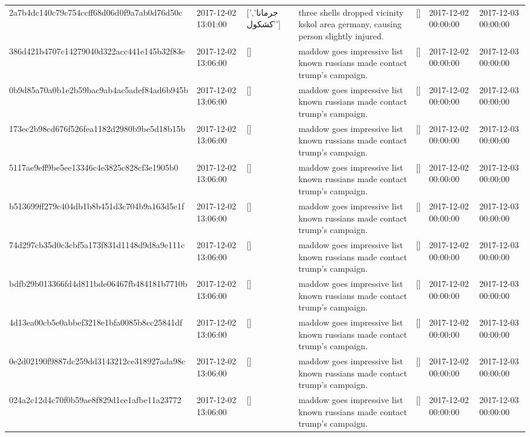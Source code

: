 \begin{tabular}{lllllll}
2a7b4dc140c79c754ccff68d06d0f9a7ab0d76d50c & 2017-12-02 13:01:00 & ['جرمانا', 'كشكول'] & three shells dropped vicinity kskol area germany, causing person slightly injured. & [] & 2017-12-02 00:00:00 & 2017-12-03 00:00:00 \\
386d421b4707c14279040d322acc441e145b32f83e & 2017-12-02 13:06:00 & [] & maddow goes impressive list known russians made contact trump's campaign. & [] & 2017-12-02 00:00:00 & 2017-12-03 00:00:00 \\
0b9d85a70a0b1e2b59bac9ab4ac5adef84ad6b945b & 2017-12-02 13:06:00 & [] & maddow goes impressive list known russians made contact trump's campaign. & [] & 2017-12-02 00:00:00 & 2017-12-03 00:00:00 \\
173ec2b98cd676f526fea1182d2980b9be5d18b15b & 2017-12-02 13:06:00 & [] & maddow goes impressive list known russians made contact trump's campaign. & [] & 2017-12-02 00:00:00 & 2017-12-03 00:00:00 \\
5117ae9eff9be5ee13346c4e3825c828cf3e1905b0 & 2017-12-02 13:06:00 & [] & maddow goes impressive list known russians made contact trump's campaign. & [] & 2017-12-02 00:00:00 & 2017-12-03 00:00:00 \\
b513699ff279c404db1b8b451d3c704b9a163d5e1f & 2017-12-02 13:06:00 & [] & maddow goes impressive list known russians made contact trump's campaign. & [] & 2017-12-02 00:00:00 & 2017-12-03 00:00:00 \\
74d297cb35d0c3cbf5a173f831d1148d9d8a9e111c & 2017-12-02 13:06:00 & [] & maddow goes impressive list known russians made contact trump's campaign. & [] & 2017-12-02 00:00:00 & 2017-12-03 00:00:00 \\
bdfb29b013366fd4d811bde06467fb484181b7710b & 2017-12-02 13:06:00 & [] & maddow goes impressive list known russians made contact trump's campaign. & [] & 2017-12-02 00:00:00 & 2017-12-03 00:00:00 \\
4d13ea00cb5e0abbef3218e1bfa0085b8cc25841df & 2017-12-02 13:06:00 & [] & maddow goes impressive list known russians made contact trump's campaign. & [] & 2017-12-02 00:00:00 & 2017-12-03 00:00:00 \\
0e2d02190f9887dc259dd3143212ce318927ada98c & 2017-12-02 13:06:00 & [] & maddow goes impressive list known russians made contact trump's campaign. & [] & 2017-12-02 00:00:00 & 2017-12-03 00:00:00 \\
024a2c12d4c70f0b59ae8f829d1ce1afbe11a23772 & 2017-12-02 13:06:00 & [] & maddow goes impressive list known russians made contact trump's campaign. & [] & 2017-12-02 00:00:00 & 2017-12-03 00:00:00 \\

\end{tabular}
